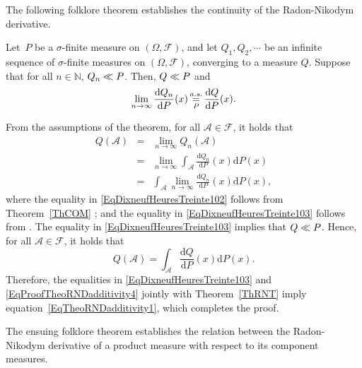 \documentclass[lettersize,onecolumn]{IEEEtran}
\begin{document}
%
The following folklore theorem establishes the continuity of the Radon-Nikodym derivative.
\begin{theorem}[Continuity]
Let~$P$ be a $\sigma$-finite measure on $\left(\Omega, \mathscr{F} \right)$, and let $Q_1, Q_2, \cdots$ be an infinite
sequence of $\sigma$-finite measures on $\left( \Omega, \mathscr{F} \right)$, converging to a measure $Q$. Suppose that for all $n \in \mathbb{N}$, ${Q_n}\ll{P}$.
Then, ${Q}\ll{P}$ and 
\begin{equation}\label{EqTheoRNDadditivity1}
\displaystyle\lim_{n \rightarrow \infty}  \frac{ \mathrm{d} Q_n}{\mathrm{d}P}(x) \displaystyle\mathop{ \stackrel{a.s.}{=}}_{P}  \frac{\mathrm{d}Q}{\mathrm{d}P}(x).
\end{equation}
\end{theorem}
\begin{IEEEproof}
From the assumptions of the theorem, for all  $\mathcal{A} \in \mathscr{F}$, it holds that
%
\begin{eqnarray}
\label{EqDixneufHeuresTreinte101}
Q (\mathcal{A}) 
& = & \lim_{n \rightarrow \infty}  Q _n (\mathcal{A}) \\
\label{EqDixneufHeuresTreinte102}
& =& \lim_{n \rightarrow \infty} \int_{\mathcal{A}}  \frac{ \mathrm{d} Q_n} {\mathrm{d}P}(x) \mathrm{d} P(x) \\
\label{EqDixneufHeuresTreinte103}
& = &  \int_{\mathcal{A}} \lim_{n \to \infty} \frac{ \mathrm{d} Q_n} {\mathrm{d}P}(x) \mathrm{d} P(x),
\end{eqnarray}
where 
the equality in \eqref{EqDixneufHeuresTreinte102} follows from Theorem~\ref{ThCOM}
; and 
the equality in \eqref{EqDixneufHeuresTreinte103} follows from \cite[Theorem~1.6.2]{ash2000probability}.
%
The equality in \eqref{EqDixneufHeuresTreinte103} implies that ${Q}\ll{P}$. Hence, for all  $\mathcal{A} \in \mathscr{F}$, it holds that
\begin{equation}
\label{EqProofTheoRNDadditivity4}
Q (\mathcal{A}) = \int_{\mathcal{A}} \frac{ \mathrm{d} Q}  {\mathrm{d} P}(x) \mathrm{d} P(x).
\end{equation}
Therefore, the equalities in \eqref{EqDixneufHeuresTreinte103} and \eqref{EqProofTheoRNDadditivity4} jointly with Theorem~\ref{ThRNT} imply equation~\eqref{EqTheoRNDadditivity1}, which completes the proof.
\end{IEEEproof}
%
The ensuing folklore theorem establishes the relation between the Radon-Nikodym derivative of a product measure with respect to its component measures. 
\end{document}
